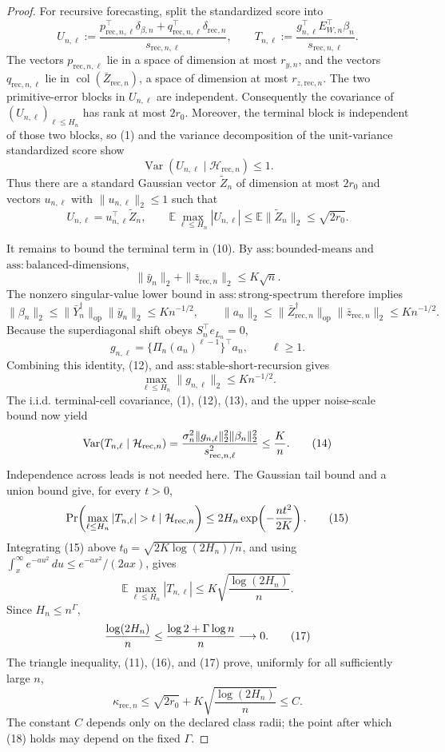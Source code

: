 \documentclass{article}
\begin{document}
\begin{proof}
For recursive forecasting, split the standardized score into
\[
 U_{n,\ell}:=\frac{p_{\mathrm{rec},n,\ell}^{\top}\delta_{\beta,n}
 +q_{\mathrm{rec},n,\ell}^{\top}\delta_{\mathrm{rec},n}}
 {s_{\mathrm{rec},n,\ell}},
 \qquad
 T_{n,\ell}:=\frac{g_{n,\ell}^{\top}E_{W,n}^{\top}\beta_n}
 {s_{\mathrm{rec},n,\ell}}.
 \tag{10}
\]
The vectors \(p_{\mathrm{rec},n,\ell}\) lie in a space of dimension at most \(r_{y,n}\), and the vectors \(q_{\mathrm{rec},n,\ell}\) lie in \(\operatorname{col}(\bar Z_{\mathrm{rec},n})\), a space of dimension at most \(r_{z,\mathrm{rec},n}\).  The two primitive-error blocks in \(U_{n,\ell}\) are independent.  Consequently the covariance of \((U_{n,\ell})_{\ell\le H_n}\) has rank at most \(2r_0\).  Moreover, the terminal block is independent of those two blocks, so (1) and the variance decomposition of the unit-variance standardized score show
\[
 \operatorname{Var}(U_{n,\ell}\mid\mathcal H_{\mathrm{rec},n})\le1.
\]
Thus there are a standard Gaussian vector \(\widetilde Z_n\) of dimension at most \(2r_0\) and vectors \(u_{n,\ell}\) with \(\|u_{n,\ell}\|_2\le1\) such that
\[
 U_{n,\ell}=u_{n,\ell}^{\top}\widetilde Z_n,
 \qquad
 \mathbb E\max_{\ell\le H_n}|U_{n,\ell}|
 \le\mathbb E\|\widetilde Z_n\|_2\le\sqrt{2r_0}.
 \tag{11}
\]

It remains to bound the terminal term in (10).  By \(\mathrm{ass{:}bounded\mbox{-}means}\) and \(\mathrm{ass{:}balanced\mbox{-}dimensions}\),
\[
 \|\bar y_n\|_2+\|\bar z_{\mathrm{rec},n}\|_2\le K\sqrt n.
\]
The nonzero singular-value lower bound in \(\mathrm{ass{:}strong\mbox{-}spectrum}\) therefore implies
\[
 \|\beta_n\|_2
 \le\|\bar Y_n^\dagger\|_{\mathrm{op}}\|\bar y_n\|_2
 \le K n^{-1/2},
 \qquad
 \|a_n\|_2
 \le\|\bar Z_{\mathrm{rec},n}^\dagger\|_{\mathrm{op}}
       \|\bar z_{\mathrm{rec},n}\|_2
 \le K n^{-1/2}.
 \tag{12}
\]
Because the superdiagonal shift obeys \(S_n^{\top}e_{L_n}=0\),
\[
 g_{n,\ell}
 =\{\Pi_n(a_n)^{\ell-1}\}^{\top}a_n,
 \qquad \ell\ge1.
\]
Combining this identity, (12), and \(\mathrm{ass{:}stable\mbox{-}short\mbox{-}recursion}\) gives
\[
 \max_{\ell\le H_n}\|g_{n,\ell}\|_2\le K n^{-1/2}.
 \tag{13}
\]
The i.i.d. terminal-cell covariance, (1), (12), (13), and the upper noise-scale bound now yield
\[
 \operatorname{Var}(T_{n,\ell}\mid\mathcal H_{\mathrm{rec},n})
 ={\sigma_n^2\|g_{n,\ell}\|_2^2\|\beta_n\|_2^2
   \over s_{\mathrm{rec},n,\ell}^2}
 \le {K\over n}.
 \tag{14}
\]
Independence across leads is not needed here.  The Gaussian tail bound and a union bound give, for every \(t>0\),
\[
 \Pr\!\left(\max_{\ell\le H_n}|T_{n,\ell}|>t
       \mid\mathcal H_{\mathrm{rec},n}\right)
 \le2H_n\exp\!\left(-{nt^2\over2K}\right).
 \tag{15}
\]
Integrating (15) above
\(t_0=\sqrt{2K\log(2H_n)/n}\), and using
\(\int_x^\infty e^{-au^2}\,du\le e^{-ax^2}/(2ax)\), gives
\[
 \mathbb E\max_{\ell\le H_n}|T_{n,\ell}|
 \le K\sqrt{\frac{\log(2H_n)}n}.
 \tag{16}
\]
Since \(H_n\le n^\Gamma\),
\[
 {\log(2H_n)\over n}
 \le {\log2+\Gamma\log n\over n}\longrightarrow0.
 \tag{17}
\]
The triangle inequality, (11), (16), and (17) prove, uniformly for all sufficiently large \(n\),
\[
 \kappa_{\mathrm{rec},n}
 \le\sqrt{2r_0}+K\sqrt{\frac{\log(2H_n)}n}
 \le C.
 \tag{18}
\]
The constant \(C\) depends only on the declared class radii; the point after which (18) holds may depend on the fixed \(\Gamma\).


\end{proof}
\end{document}
